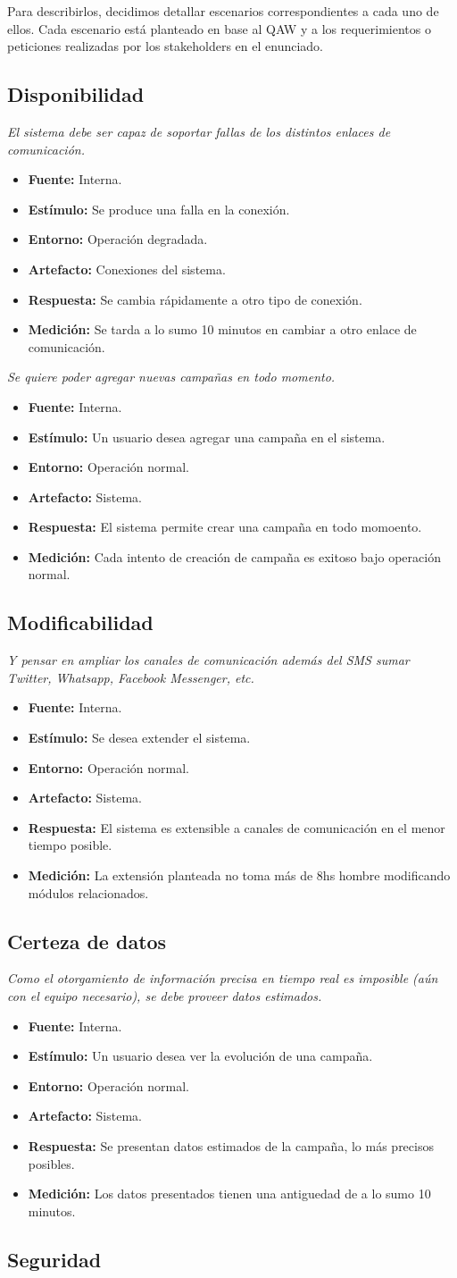 \documentclass[a4paper, 10pt, twoside]{article}
\newcommand{\escenario}[7] {
  \textit{{#1}}
  \begin{itemize}
    \item \textbf{Fuente:} {#2}
    \item \textbf{Estímulo:} {#3}
    \item \textbf{Entorno:} {#4}
    \item \textbf{Artefacto:} {#5}
    \item \textbf{Respuesta:} {#6}
    \item \textbf{Medición:} {#7}
  \end{itemize}
}
\begin{document}
Para describirlos, decidimos detallar escenarios correspondientes a cada uno de ellos.
Cada escenario está planteado en base al QAW y a los requerimientos o peticiones realizadas por los stakeholders en el enunciado.

\subsection{Disponibilidad}

\escenario{El sistema debe ser capaz de soportar fallas de los distintos enlaces de comunicación.}
    {Interna.}
    {Se produce una falla en la conexión.}
    {Operación degradada.}
    {Conexiones del sistema.}
    {Se cambia rápidamente a otro tipo de conexión.}
    {Se tarda a lo sumo 10 minutos en cambiar a otro enlace de comunicación.}

\escenario{Se quiere poder agregar nuevas campañas en todo momento.}
    {Interna.}
    {Un usuario desea agregar una campaña en el sistema.}
    {Operación normal.}
    {Sistema.}
    {El sistema permite crear una campaña en todo momoento.}
    {Cada intento de creación de campaña es exitoso bajo operación normal.}

\subsection{Modificabilidad}
\escenario{Y pensar en ampliar los canales de comunicación además del SMS sumar Twitter, Whatsapp, Facebook Messenger, etc.}
    {Interna.}
    {Se desea extender el sistema.}
    {Operación normal.}
    {Sistema.}
    {El sistema es extensible a canales de comunicación en el menor tiempo posible.}
    {La extensión planteada no toma más de 8hs hombre modificando módulos relacionados.}


\subsection{Certeza de datos}
\escenario{Como el otorgamiento de información precisa en tiempo real es imposible (aún con el equipo necesario), se debe proveer datos estimados.}
    {Interna.}
    {Un usuario desea ver la evolución de una campaña.}
    {Operación normal.}
    {Sistema.}
    {Se presentan datos estimados de la campaña, lo más precisos posibles.}
    {Los datos presentados tienen una antiguedad de a lo sumo 10 minutos.}

\subsection{Seguridad}
\end{document}
